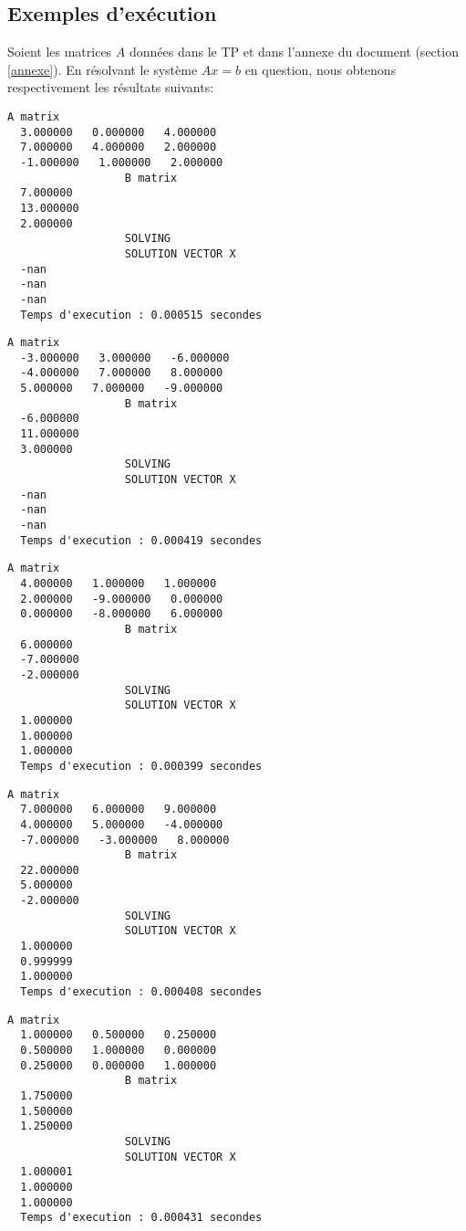\documentclass{report}
\begin{document}
\subsection{Exemples d'exécution}
Soient les matrices $A$ données dans le TP et dans l'annexe du document (section \ref{annexe}).
En résolvant le système $Ax=b$ en question, nous obtenons respectivement les résultats suivants:
\\
\begin{lstlisting}[caption={$A_1X=B$} results, basicstyle=\fontsize{8}{10}\selectfont]
                  A matrix 
  3.000000   0.000000   4.000000   
  7.000000   4.000000   2.000000   
  -1.000000   1.000000   2.000000   
                  B matrix 
  7.000000   
  13.000000   
  2.000000   
                  SOLVING 
                  SOLUTION VECTOR X 
  -nan   
  -nan   
  -nan   
  Temps d'execution : 0.000515 secondes
\end{lstlisting}
\begin{lstlisting}[caption={$A_2X=B$} results, basicstyle=\fontsize{8}{10}\selectfont]
                  A matrix
  -3.000000   3.000000   -6.000000   
  -4.000000   7.000000   8.000000   
  5.000000   7.000000   -9.000000   
                  B matrix
  -6.000000   
  11.000000   
  3.000000   
                  SOLVING
                  SOLUTION VECTOR X 
  -nan   
  -nan   
  -nan   
  Temps d'execution : 0.000419 secondes
\end{lstlisting}
\begin{lstlisting}[caption={$A_3X=B$} results, basicstyle=\fontsize{8}{10}\selectfont]
                  A matrix
  4.000000   1.000000   1.000000   
  2.000000   -9.000000   0.000000   
  0.000000   -8.000000   6.000000   
                  B matrix
  6.000000   
  -7.000000   
  -2.000000   
                  SOLVING
                  SOLUTION VECTOR X 
  1.000000   
  1.000000   
  1.000000   
  Temps d'execution : 0.000399 secondes
\end{lstlisting}
\begin{lstlisting}[caption={$A_4X=B$} results, basicstyle=\fontsize{8}{10}\selectfont]
                  A matrix
  7.000000   6.000000   9.000000   
  4.000000   5.000000   -4.000000   
  -7.000000   -3.000000   8.000000   
                  B matrix
  22.000000   
  5.000000   
  -2.000000   
                  SOLVING
                  SOLUTION VECTOR X 
  1.000000   
  0.999999   
  1.000000   
  Temps d'execution : 0.000408 secondes
\end{lstlisting}
\begin{lstlisting}[caption={$A_5X=B$} results, basicstyle=\fontsize{8}{10}\selectfont]
                  A matrix
  1.000000   0.500000   0.250000   
  0.500000   1.000000   0.000000   
  0.250000   0.000000   1.000000   
                  B matrix
  1.750000   
  1.500000   
  1.250000   
                  SOLVING
                  SOLUTION VECTOR X 
  1.000001   
  1.000000   
  1.000000   
  Temps d'execution : 0.000431 secondes
\end{lstlisting}
\end{document}
